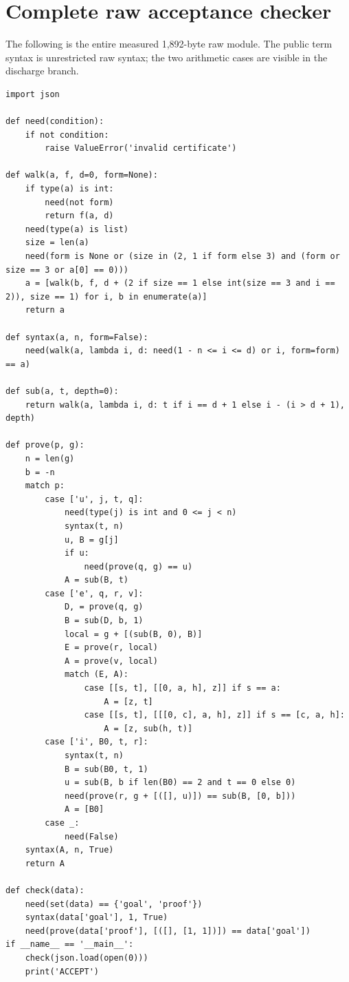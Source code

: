 \documentclass[11pt,letterpaper]{article}
\theoremstyle{definition}\newtheorem{definition}[theorem]{Definition}
\theoremstyle{remark}\newtheorem{remark}[theorem]{Remark}
\begin{document}
\section{Complete raw acceptance checker}
The following is the entire measured 1,892-byte raw module. The public term syntax is unrestricted raw syntax; the two arithmetic cases are visible in the discharge branch.
\begin{lstlisting}[basicstyle=\ttfamily\fontsize{7.6}{8.7}\selectfont]
import json

def need(condition):
    if not condition:
        raise ValueError('invalid certificate')

def walk(a, f, d=0, form=None):
    if type(a) is int:
        need(not form)
        return f(a, d)
    need(type(a) is list)
    size = len(a)
    need(form is None or (size in (2, 1 if form else 3) and (form or size == 3 or a[0] == 0)))
    a = [walk(b, f, d + (2 if size == 1 else int(size == 3 and i == 2)), size == 1) for i, b in enumerate(a)]
    return a

def syntax(a, n, form=False):
    need(walk(a, lambda i, d: need(1 - n <= i <= d) or i, form=form) == a)

def sub(a, t, depth=0):
    return walk(a, lambda i, d: t if i == d + 1 else i - (i > d + 1), depth)

def prove(p, g):
    n = len(g)
    b = -n
    match p:
        case ['u', j, t, q]:
            need(type(j) is int and 0 <= j < n)
            syntax(t, n)
            u, B = g[j]
            if u:
                need(prove(q, g) == u)
            A = sub(B, t)
        case ['e', q, r, v]:
            D, = prove(q, g)
            B = sub(D, b, 1)
            local = g + [(sub(B, 0), B)]
            E = prove(r, local)
            A = prove(v, local)
            match (E, A):
                case [[s, t], [[0, a, h], z]] if s == a:
                    A = [z, t]
                case [[s, t], [[[0, c], a, h], z]] if s == [c, a, h]:
                    A = [z, sub(h, t)]
        case ['i', B0, t, r]:
            syntax(t, n)
            B = sub(B0, t, 1)
            u = sub(B, b if len(B0) == 2 and t == 0 else 0)
            need(prove(r, g + [([], u)]) == sub(B, [0, b]))
            A = [B0]
        case _:
            need(False)
    syntax(A, n, True)
    return A

def check(data):
    need(set(data) == {'goal', 'proof'})
    syntax(data['goal'], 1, True)
    need(prove(data['proof'], [([], [1, 1])]) == data['goal'])
if __name__ == '__main__':
    check(json.load(open(0)))
    print('ACCEPT')
\end{lstlisting}
\clearpage
\end{document}
